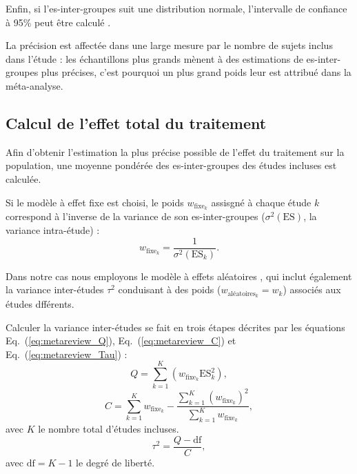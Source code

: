 Enfin, si l'\gls{es}-inter-groupes suit une distribution normale, l'intervalle de confiance à 95\% peut être calculé \citep{Borenstein2009}.

La précision est affectée dans une large mesure par le nombre de sujets inclus dans l'étude : les échantillons plus grands mènent à des
estimations de \gls{es}-inter-groupes plus précises, c'est pourquoi un plus grand poids leur est attribué dans la méta-analyse.

\subsection{Calcul de l'effet total du traitement}

Afin d'obtenir l'estimation la plus précise possible de l'effet du traitement sur la population, une moyenne pondérée des \gls{es}-inter-groupes 
des études incluses est calculée.

Si le modèle à effet fixe est choisi, le poids $w_{\text{fixe}_k}$ assisgné à chaque étude $k$ correspond à l'inverse de la variance de son 
\gls{es}-inter-groupes ($\sigma^2(\text{ES})$, la variance intra-étude) \citep{Borenstein2009} :
\begin{equation}
\label{eq:metareview_weight_fixed_study}
w_{\text{fixe}_k} = \frac{1}{\sigma^2(\text{ES}_k)}.
\end{equation} 

Dans notre cas nous employons le modèle à effets aléatoires \citep{Bussalb2019}, qui inclut également la variance inter-études $\tau^2$ conduisant à des 
poids ($w_{\text{aléatoires}_k} = w_k$) associés aux études dfférents.

Calculer la variance inter-études se fait en trois étapes décrites par les équations Eq.~(\ref{eq:metareview_Q}), Eq.~(\ref{eq:metareview_C}) 
et Eq.~(\ref{eq:metareview_Tau}) \citep{Borenstein2009} :
\begin{equation}
\label{eq:metareview_Q}
Q = \sum_{k=1}^{K} (w_{\text{fixe}_k} \text{ES}_k^2),
\end{equation}
\begin{equation}
\label{eq:metareview_C}
C = \sum_{k=1}^{K} w_{\text{fixe}_k} - \frac{ \sum_{k=1}^{K} (w_{\text{fixe}_k})^2 } { \sum_{k=1}^{K} w_{\text{fixe}_k} },
\end{equation}
avec $K$ le nombre total d'études incluses.
\begin{equation}
\label{eq:metareview_Tau}
\tau^2 = \frac{Q - \text{df}}{C},
\end{equation}
avec $\text{df} = K - 1$ le degré de liberté.

